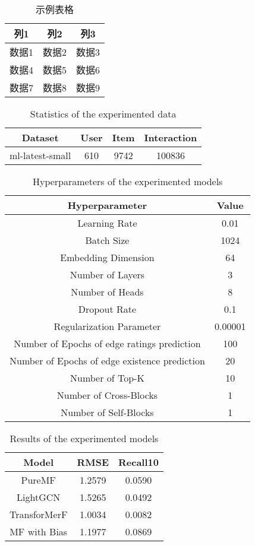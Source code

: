 \documentclass{article}
\begin{document}
\begin{table}[htbp]
  \centering
  \caption{示例表格}
  \label{tab:example}
  \begin{tabular}{ccc}
    \toprule
    列1 & 列2 & 列3 \\
    \midrule
    数据1 & 数据2 & 数据3 \\
    数据4 & 数据5 & 数据6 \\
    数据7 & 数据8 & 数据9 \\
    \bottomrule
  \end{tabular}
\end{table}

\begin{table}[htbp]
  \centering
  \caption{Statistics of the experimented data}
  \label{tab:example1}
  \begin{tabular}{cccc}
      \toprule
      Dataset & User & Item  & Interaction \\
      \midrule
      ml-latest-small & 610 & 9742 & 100836 \\
      \bottomrule
  \end{tabular}
  \end{table}

\begin{table}[htbp]
\centering
\caption{Hyperparameters of the experimented models}
\label{tab:hyperparameters}
\begin{tabular}{cc}
    \toprule
    Hyperparameter & Value \\
    \midrule
    Learning Rate & 0.01 \\
    Batch Size & 1024 \\
    Embedding Dimension & 64 \\
    Number of Layers & 3 \\
    Number of Heads & 8 \\
    Dropout Rate & 0.1 \\
    Regularization Parameter & 0.00001 \\
    Number of Epochs of edge ratings prediction & 100 \\
    Number of Epochs of edge existence prediction & 20 \\
    Number of Top-K & 10 \\
    Number of Cross-Blocks & 1 \\
    Number of Self-Blocks & 1 \\
    \bottomrule
\end{tabular}
\end{table}

\begin{table}[htbp]
\centering
\caption{Results of the experimented models}
\label{tab:resultsss}
\begin{tabular}{ccc}
    \toprule
    Model & RMSE & Recall10 \\
    \midrule
    PureMF & 1.2579 & 0.0590 \\
    LightGCN & 1.5265 & 0.0492 \\
    TransforMerF & 1.0034 & 0.0082 \\
    MF with Bias & 1.1977 & 0.0869 \\
    \bottomrule
\end{tabular}
\end{table}
\end{document}
